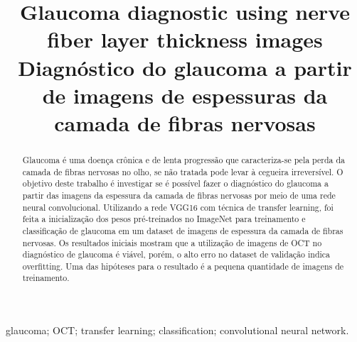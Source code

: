 \documentclass[conference]{IEEEtran}
\begin{document}
\title{Glaucoma diagnostic using nerve fiber layer thickness images \\ Diagnóstico do glaucoma a partir de imagens de espessuras da camada de fibras nervosas}


\author{
}


\maketitle

\thispagestyle{fancy}

\renewcommand{\abstractname}{Abstract}
\begin{abstract}
\end{abstract}

\renewcommand\IEEEkeywordsname{Keywords}
\begin{IEEEkeywords}
\label{Keywords}
glaucoma; OCT; transfer learning; classification; convolutional neural network.
\end{IEEEkeywords}

\renewcommand{\abstractname}{Resumo}
\begin{abstract}
\label{Resumo}
Glaucoma é uma doença crônica e de lenta progressão que caracteriza-se pela perda da camada de fibras nervosas no olho, se não tratada pode levar à cegueira irreversível. 
O objetivo deste trabalho é investigar se é possível fazer o diagnóstico do glaucoma a partir das imagens da espessura da camada de fibras nervosas por meio de uma rede neural convolucional.
Utilizando a rede VGG16 com técnica de transfer learning, foi feita a inicialização dos pesos pré-treinados no ImageNet para treinamento e classificação de glaucoma em um dataset de imagens de espessura da camada de fibras nervosas.
Os resultados iniciais mostram que a utilização de imagens de OCT no diagnóstico de glaucoma é viável, porém, o alto erro no dataset de validação indica overfitting. Uma das hipóteses para o resultado é a pequena quantidade de imagens de treinamento.

\end{abstract}
\end{document}
